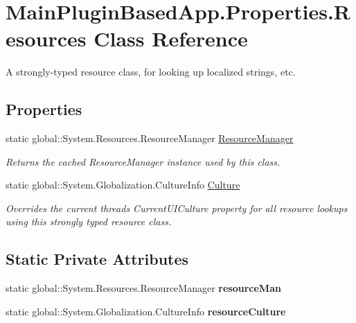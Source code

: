 \hypertarget{class_main_plugin_based_app_1_1_properties_1_1_resources}{}\section{Main\+Plugin\+Based\+App.\+Properties.\+Resources Class Reference}
\label{class_main_plugin_based_app_1_1_properties_1_1_resources}


A strongly-\/typed resource class, for looking up localized strings, etc.  


\subsection*{Properties}
\begin{DoxyCompactItemize}
\item 
static global\+::\+System.\+Resources.\+Resource\+Manager \mbox{\hyperlink{class_main_plugin_based_app_1_1_properties_1_1_resources_af9fd9627f43df828a28722fd09ac12f5}{Resource\+Manager}}
\begin{DoxyCompactList}\small\item\em Returns the cached Resource\+Manager instance used by this class. \end{DoxyCompactList}\item 
static global\+::\+System.\+Globalization.\+Culture\+Info \mbox{\hyperlink{class_main_plugin_based_app_1_1_properties_1_1_resources_a19793cbf603ab75337a5406fe2c38a3e}{Culture}}
\begin{DoxyCompactList}\small\item\em Overrides the current thread\textquotesingle{}s Current\+U\+I\+Culture property for all resource lookups using this strongly typed resource class. \end{DoxyCompactList}\end{DoxyCompactItemize}
\subsection*{Static Private Attributes}
\begin{DoxyCompactItemize}
\item 
\mbox{\label{class_main_plugin_based_app_1_1_properties_1_1_resources_a41910fe93b17ea2bdcb200af7836d3db}} 
static global\+::\+System.\+Resources.\+Resource\+Manager {\bfseries resource\+Man}
\item 
\mbox{\label{class_main_plugin_based_app_1_1_properties_1_1_resources_aa8bee8c675d900323d200a10d1f26b8c}} 
static global\+::\+System.\+Globalization.\+Culture\+Info {\bfseries resource\+Culture}
\end{DoxyCompactItemize}


